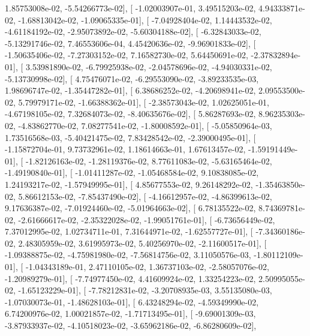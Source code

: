 \documentclass{article}
\begin{document}
          1.85753008e-02,  -5.54266773e-02],
       [ -1.02003907e-01,   3.49515203e-02,   4.94333871e-02,
         -1.68813042e-02,  -1.09065335e-01],
       [ -7.04928404e-02,   1.14443532e-02,  -4.61184192e-02,
         -2.95073892e-02,  -5.60304188e-02],
       [ -6.32843033e-02,  -5.13291746e-02,   7.46553606e-04,
          4.45420636e-02,  -9.96901833e-02],
       [ -1.50635406e-02,  -7.27303152e-02,   7.16582730e-02,
          5.64450691e-02,  -2.37832894e-01],
       [  3.53981890e-02,  -6.79925938e-02,  -2.04578696e-02,
         -4.94030331e-02,  -5.13730998e-02],
       [  4.75476071e-02,  -6.29553090e-02,  -3.89233535e-03,
          1.98696747e-02,  -1.35447282e-01],
       [  6.38686252e-02,  -4.20698941e-02,   2.09553500e-02,
          5.79979171e-02,  -1.66388362e-01],
       [ -2.38573043e-02,   1.02625051e-01,  -4.67198105e-02,
          7.32684073e-02,  -8.40635676e-02],
       [  5.86287693e-02,   8.96235303e-02,  -4.83862770e-02,
          7.08277541e-02,  -1.80008592e-01],
       [ -5.05850964e-03,   1.73516568e-03,  -5.40421475e-02,
          7.83428542e-02,  -2.39000495e-01],
       [ -1.15872704e-01,   9.73732961e-02,   1.18614663e-01,
          1.67613457e-02,  -1.59191449e-01],
       [ -1.82126163e-02,  -1.28119376e-02,   8.77611083e-02,
         -5.63165464e-02,  -1.49190840e-01],
       [ -1.01411287e-02,  -1.05468584e-02,   9.10838085e-02,
          1.24193217e-02,  -1.57949995e-01],
       [  4.85677553e-02,   9.26148292e-02,  -1.35463850e-02,
          5.86612153e-02,  -7.85437490e-02],
       [ -4.16612957e-02,  -4.86399613e-02,   9.17636387e-02,
         -7.01924460e-02,  -5.01964663e-02],
       [  6.78135522e-02,   8.74369781e-02,  -2.61666617e-02,
         -2.35322028e-02,  -1.99051761e-01],
       [ -6.73656449e-02,   7.37012995e-02,   1.02734711e-01,
          7.31644971e-02,  -1.62557727e-01],
       [ -7.34360186e-02,   2.48305959e-02,   3.61995973e-02,
          5.40256970e-02,  -2.11600517e-01],
       [ -1.09388875e-02,  -4.75981980e-02,  -7.56814756e-02,
          3.11050576e-03,  -1.80112109e-01],
       [ -1.04343189e-01,   2.47110105e-02,   1.36737103e-02,
         -2.58057076e-02,  -1.20989279e-01],
       [ -7.74977450e-02,   4.41609924e-02,   1.33254223e-02,
          2.50995055e-02,  -1.65123229e-01],
       [ -7.78212831e-02,  -3.20708935e-03,   3.55135080e-03,
         -1.07030073e-01,  -1.48628103e-01],
       [  6.43248294e-02,  -4.59349990e-02,   6.74200976e-02,
          1.00021857e-02,  -1.71713495e-01],
       [ -9.69001309e-03,  -3.87933937e-02,  -4.10518023e-02,
         -3.65962186e-02,  -6.86280609e-02],
\end{document}
